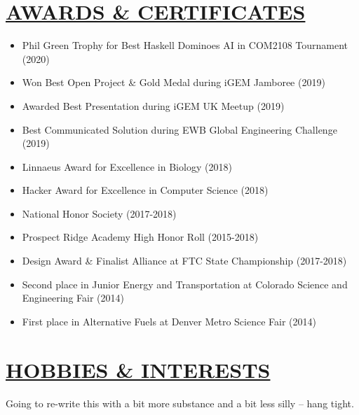\documentclass[twocolumn, a4paper, fontsize=9pt, headsepline, footsepline]{scrartcl}
\begin{document}
\section*{\ul{AWARDS \& CERTIFICATES}}
\begin{itemize}
\item Phil Green Trophy for Best Haskell Dominoes AI in COM2108 Tournament (2020)
\item Won Best Open Project \& Gold Medal during iGEM Jamboree (2019)
\item Awarded Best Presentation during iGEM UK Meetup (2019)
\item Best Communicated Solution during EWB Global Engineering Challenge (2019)
\item Linnaeus Award for Excellence in Biology (2018)
\item Hacker Award for Excellence in Computer Science (2018)
\item National Honor Society (2017-2018)
\item Prospect Ridge Academy High Honor Roll (2015-2018)
\item Design Award \& Finalist Alliance at FTC State Championship (2017-2018)
\item Second place in Junior Energy and Transportation at Colorado Science and
  Engineering Fair (2014)
\item First place in Alternative Fuels at Denver Metro Science Fair (2014)
\end{itemize}
\section*{\ul{HOBBIES \& INTERESTS}}
\noindent
Going to re-write this with a bit more substance and a bit less silly – hang tight.
\pagebreak
\end{document}

